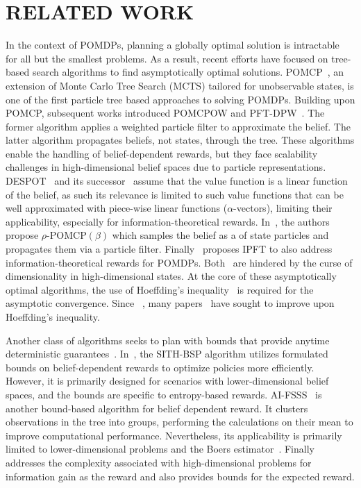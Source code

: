 \section{RELATED WORK}

In the context of POMDPs, planning a globally optimal solution is intractable~\cite{Papadimitriou87math} for all but the smallest problems. As a result, recent efforts have focused on tree-based search algorithms to find asymptotically optimal solutions. POMCP~\cite{Silver10nips}, an extension of Monte Carlo Tree Search (MCTS) tailored for unobservable states, is one of the first particle tree based approaches to solving POMDPs. Building upon POMCP, subsequent works introduced POMCPOW and PFT-DPW~\cite{Sunberg18icaps}. The former algorithm applies a weighted particle filter to approximate the belief. The latter algorithm propagates beliefs, not states, through the tree. These algorithms enable the handling of belief-dependent rewards, but they face scalability challenges in high-dimensional belief spaces due to particle representations. DESPOT~\cite{Ye17jair} and its successor~\cite{Garg19rss} assume that the value function is a linear function of the belief, as such its relevance is limited to such value functions that can be well approximated with piece-wise linear functions ($\alpha$-vectors), limiting their applicability, especially for information-theoretical rewards. In~\cite{Thomas21arxiv}, the authors propose $\rho$-POMCP$(\beta)$ which samples the belief as a  of state particles and propagates them via a particle filter. Finally~\cite{Fischer20icml} proposes IPFT to also address information-theoretical rewards for POMDPs. Both~\cite{Thomas21arxiv,Fischer20icml} are hindered by the curse of dimensionality in high-dimensional states. At the core of these asymptotically optimal algorithms, the use of Hoeffding's inequality~\cite{Hoeffding63jasa} is required for the asymptotic convergence. Since~\cite{Hoeffding63jasa} , many papers~\cite{Bentkus08lmj, From13jscs, Cohen15as} have sought to improve upon Hoeffding's inequality.

Another class of algorithms seeks to plan with bounds that provide anytime deterministic guarantees~\cite{Barenboim23nips}. In~\cite{Sztyglic22iros}, the SITH-BSP algorithm utilizes formulated bounds on belief-dependent rewards to optimize policies more efficiently. However, it is primarily designed for scenarios with lower-dimensional belief spaces, and the bounds are specific to entropy-based rewards. AI-FSSS~\cite{Barenboim22ijcai} is another bound-based algorithm for belief dependent reward. It clusters observations in the tree into groups, performing the calculations on their mean to improve computational performance. Nevertheless, its applicability is primarily limited to lower-dimensional problems and the Boers estimator~\cite{Boers10fusion}. Finally~\cite{Yotam24tro} addresses the complexity associated with high-dimensional problems for information gain as the reward and also provides bounds for the expected reward.

